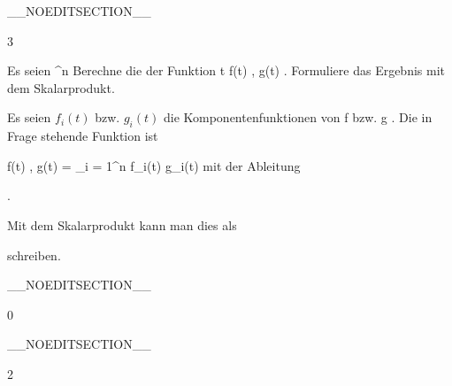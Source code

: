 __NOEDITSECTION__

{3}

{

Es seien
 {\R} { \R^n
} {}
Berechne die
der Funktion
\maabbeledisp {} {\R} {\R
} { t } { \left\langle f(t) , g(t)  \right\rangle
} {.}
Formuliere das Ergebnis mit dem Skalarprodukt.

}
{

Es seien $f_i(t)$ bzw. $g_i(t)$ die Komponentenfunktionen von
\mathkor {} {f} {bzw.} {g} {.}
Die in Frage stehende Funktion ist

\mavergleichskettedisp
{\vergleichskette
{  \left\langle f(t) , g(t)  \right\rangle
}
{ =} { \sum_{i = 1}^n  f_i(t) g_i(t)
}
{ } {
}
{ } {
}
{ } {
}
}
{}{}{}
mit der Ableitung
 {} {}

 { . }

Mit dem Skalarprodukt kann man dies als

 {  }

schreiben.

 }

__NOEDITSECTION__

{0}

{

}
{  }

__NOEDITSECTION__

{2}

